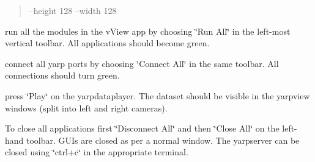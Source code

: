 \begin{quote}
--height 128 --width 128 \end{quote}



\begin{DoxyItemize}
\item run all the modules in the v\+View app by choosing \char`\"{}\+Run All\char`\"{} in the left-\/most vertical toolbar. All applications should become green.
\item connect all yarp ports by choosing \char`\"{}\+Connect All\char`\"{} in the same toolbar. All connections should turn green.
\item press \char`\"{}\+Play\char`\"{} on the yarpdataplayer. The dataset should be visible in the yarpview windows (split into left and right cameras).
\item To close all applications first \char`\"{}\+Disconnect All\char`\"{} and then \char`\"{}\+Close All\char`\"{} on the left-\/hand toolbar. G\+UI\textquotesingle{}s are closed as per a normal window. The yarpserver can be closed using \char`\"{}ctrl+c\char`\"{} in the appropriate terminal. 
\end{DoxyItemize}